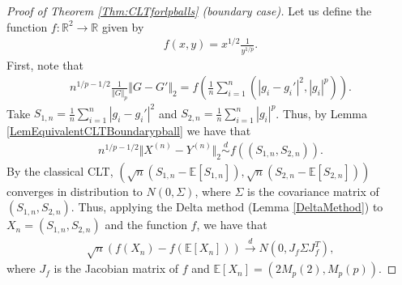 \documentclass[10pt]{amsart}
\def\R{\mathbb{R}}
\def\E{\mathbb{E}}
\numberwithin{equation}{section}
\begin{document}
\begin{proof}[Proof of Theorem \ref{Thm:CLTforlpballs} (boundary case)]
Let us define the function $f: \R^2 \to \R$ given by
\begin{align*}
f(x,y) =  x^{1/2} \frac{1}{y^{1/p}}.
\end{align*} 
First, note that
\begin{align*}
n^{1/p - 1/2} \frac{1}{\Vert G \Vert _p} \Vert G - G' \Vert _2 = f \left( \frac{1}{n} \sum _{i=1}^n \left( \left| g_i - g_i' \right|^2 , |g_i|^p \right)  \right).
\end{align*}
Take $S_{1,n} = \frac{1}{n} \sum _{i=1}^n  \left| g_i - g_i' \right|^2$ and $S_{2,n} = \frac{1}{n} \sum _{i=1}^n  \left| g_i  \right|^p$. Thus, by Lemma \ref{LemEquivalentCLTBoundarypball} we have that 
\begin{align*}
n^{1/p - 1/2} \Vert X^{(n)} - Y^{(n)} \Vert _2 \overset{d}{\sim} f\left( (S_{1,n} , S_{2,n}) \right).
\end{align*}
By the classical CLT, $\left( \sqrt{n} ( S_{1,n} - \E [S_{1,n}]), \sqrt{n} ( S_{2,n} - \E [S_{2,n}]) \right)$ converges in distribution to $N(0, \Sigma )$, where $\Sigma$ is the covariance matrix of $(S_{1,n},S_{2,n})$. Thus, applying the Delta method (Lemma \ref{DeltaMethod}) to $X_n = (S_{1,n} , S_{2,n})$ and the function $f$, we have that 
\begin{align*}
\sqrt{n} \left( f(X_n) - f\left( \E [X_n] \right) \right) \overset{d}{\to} N \left(0, J_f \Sigma J_f^T \right),
\end{align*}
where $J_f$ is the Jacobian matrix of $f$ and $\E[X_n] = (2M_p(2) , M_p(p))$.


\end{proof}
\end{document}
